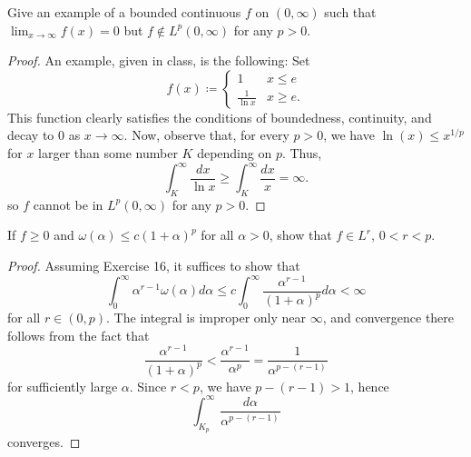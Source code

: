 \begin{problem}
Give an example of a bounded continuous $f$ on $(0,\infty)$ such that
$\lim_{x\to\infty}f(x)=0$ but $f\notin L^p(0,\infty)$ for any $p>0$.
\end{problem}
\begin{proof}
An example, given in class, is the following: Set
\begin{equation}
\label{eq:11:example}
f(x)\coloneqq
\begin{cases}
1&x\leq e\\
\frac{1}{\ln x}&x\geq e.
\end{cases}
\end{equation}
This function clearly satisfies the conditions of boundedness, continuity,
and decay to $0$ as $x\to\infty$. Now, observe that, for every $p>0$, we
have $\ln(x)\leq x^{1/p}$ for $x$ larger than some number $K$ depending on
$p$. Thus,
\[
\int_K^\infty\frac{dx}{\ln x}\geq\int_K^\infty\frac{dx}{x}=\infty.
\]
so $f$ cannot be in $L^p(0,\infty)$ for any $p>0$.
\end{proof}
\newpage

\begin{problem}
If $f\geq 0$ and $\omega(\alpha)\leq c(1+\alpha)^p$ for all $\alpha>0$,
show that $f\in L^r$, $0<r<p$.
\end{problem}
\begin{proof}
Assuming Exercise 16, it suffices to show that
\begin{equation}
\label{eq:11:need-to-show}
\int_0^\infty\alpha^{r-1}\omega(\alpha)d\alpha\leq c\int_0^\infty\frac{\alpha^{r-1}}{(1+\alpha)^p}d\alpha<\infty
\end{equation}
for all $r\in(0,p)$. The integral is improper only near $\infty$, and
convergence there follows from the fact that
\[
\frac{\alpha^{r-1}}{(1+\alpha)^p}<\frac{\alpha^{r-1}}{\alpha^p}=\frac{1}{\alpha^{p-(r-1)}}
\]
for sufficiently large $\alpha$. Since $r<p$, we have $p-(r-1)>1$, hence
\[
\int_{K_p}^\infty\frac{d\alpha}{\alpha^{p-(r-1)}}
\]
converges.
\end{proof}

